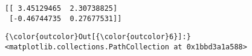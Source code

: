 \documentclass[11pt]{article}
\begin{document}
    \begin{Verbatim}[commandchars=\\\{\}]
[[ 3.45129465  2.30738825]
 [-0.46744735  0.27677531]]

    \end{Verbatim}

\begin{Verbatim}[commandchars=\\\{\}]
{\color{outcolor}Out[{\color{outcolor}6}]:} <matplotlib.collections.PathCollection at 0x1bbd3a1a588>
\end{Verbatim}
            
    \begin{center}
    \end{center}
    { \hspace*{\fill} \\}
    
\end{document}
